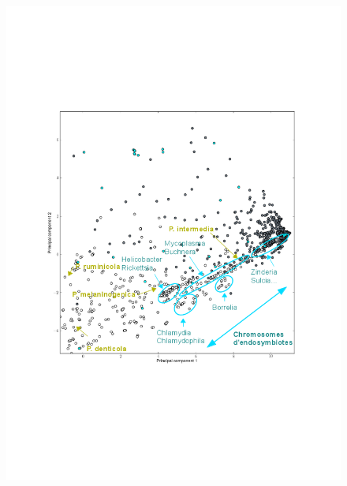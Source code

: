 \begin{figure}[H]
\begin{minipage}{0.55\textwidth}
		\includegraphics[trim=2cm 7cm 2cm 6cm,clip,width=\textwidth]{./img/pca_func_ZOOM.png}
		\label{figpcavrzoom}
	\end{minipage}
	\begin{minipage}{0.55\textwidth}

\end{minipage}
\end{figure}
